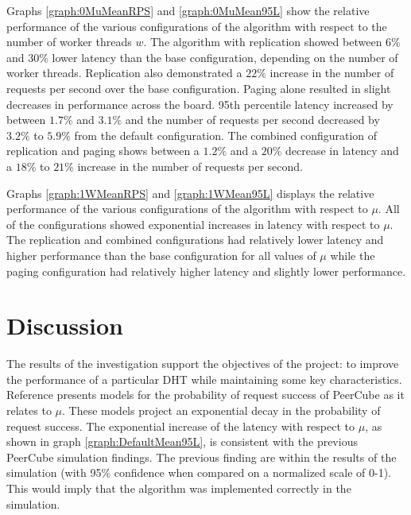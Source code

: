 \documentclass[12pt]{report}
\theoremstyle{plain}
\begin{document}
	Graphs \ref{graph:0MuMeanRPS} and \ref{graph:0MuMean95L} show the relative 
	performance of the various configurations of the algorithm with respect to the number of worker threads $w$. 
	The algorithm with replication showed between $6\%$ and $30\%$ lower latency than the base configuration, depending on the number of worker threads.
	Replication also demonstrated a $22\%$ increase in the number of requests per second over the base configuration. 
	Paging alone resulted in slight decreases in performance across the board. 
	95th percentile latency increased by between $1.7\%$ and $3.1\%$ and the number of requests per second decreased by $3.2\%$ to $5.9\%$ 
	from the default configuration. 
	The combined configuration of replication and paging shows between a $1.2\%$ and a $20\%$ decrease in 
	latency and a $18\%$ to $21\%$ increase in the number of requests per second.

	\hspace{-0.75cm}
	\begin{minipage}{0.95\textwidth}
	\vspace{-0.15cm}
	\begin{multicols}{2}
		\begin{graph}[H]%
			\centering%
		\end{graph}%
		\begin{graph}[H]%
			\centering%
		\end{graph}%
	\end{multicols}
	\vspace{0.3cm}
	\end{minipage}

	Graphs \ref{graph:1WMeanRPS} and \ref{graph:1WMean95L} displays the relative 
	performance of the various configurations of the algorithm with respect to $\mu$. 
	All of the configurations showed exponential increases in latency with respect to $\mu$.
	The replication and combined configurations had relatively lower latency and higher performance than the base configuration for all values of $\mu$ 
	while the paging configuration had relatively higher latency and slightly lower performance.


\section*{Discussion}

	The results of the investigation support the objectives of the project: to improve the performance of a particular DHT while maintaining some key characteristics. 
	Reference \cite{anceaume_peercube:_2008} presents models for the probability of request success  of PeerCube as it relates to $\mu$. 
	These models project an exponential decay in the probability of request success. 
	The exponential increase of the latency with respect to $\mu$, as shown in graph \ref{graph:DefaultMean95L}, 
	is consistent with the previous PeerCube simulation findings. The previous finding are within the results of the simulation (with 95\% confidence when compared on a normalized scale of 0-1).
	This would imply that the algorithm was implemented correctly in the simulation.
	
\end{document}
